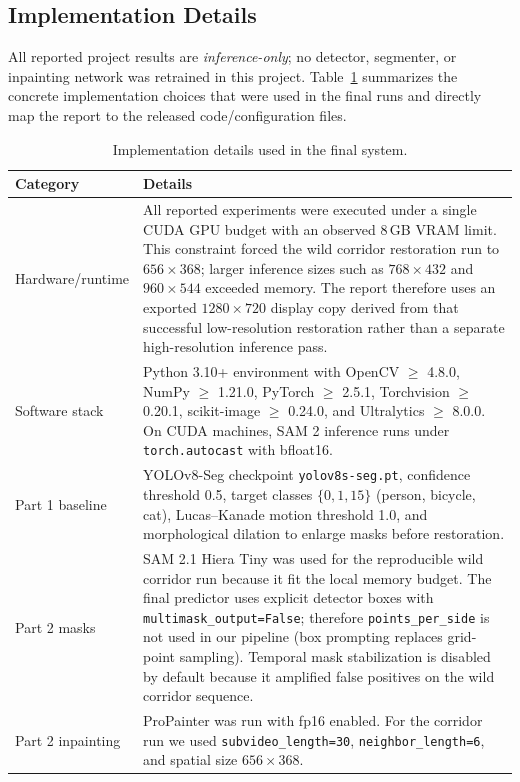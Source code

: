 \documentclass[10pt,twocolumn,letterpaper]{article}
\begin{document}
\subsection{Implementation Details}
All reported project results are \emph{inference-only}; no detector, segmenter, or inpainting network was retrained in this project. Table~\ref{tab:impl} summarizes the concrete implementation choices that were used in the final runs and directly map the report to the released code/configuration files.

\begin{table}[t]
\centering
\small
\caption{Implementation details used in the final system.}
\label{tab:impl}
\begin{tabular}{lp{}}
\toprule
Category & Details \\
\midrule
Hardware/runtime & All reported experiments were executed under a single CUDA GPU budget with an observed 8\,GB VRAM limit. This constraint forced the wild corridor restoration run to $656\times368$; larger inference sizes such as $768\times432$ and $960\times544$ exceeded memory. The report therefore uses an exported $1280\times720$ display copy derived from that successful low-resolution restoration rather than a separate high-resolution inference pass. \\
Software stack & Python 3.10+ environment with OpenCV $\geq$ 4.8.0, NumPy $\geq$ 1.21.0, PyTorch $\geq$ 2.5.1, Torchvision $\geq$ 0.20.1, scikit-image $\geq$ 0.24.0, and Ultralytics $\geq$ 8.0.0. On CUDA machines, SAM 2 inference runs under \texttt{torch.autocast} with bfloat16. \\
Part 1 baseline & YOLOv8-Seg checkpoint \texttt{yolov8s-seg.pt}, confidence threshold 0.5, target classes $\{0,1,15\}$ (person, bicycle, cat), Lucas--Kanade motion threshold 1.0, and morphological dilation to enlarge masks before restoration. \\
Part 2 masks & SAM 2.1 Hiera Tiny was used for the reproducible wild corridor run because it fit the local memory budget. The final predictor uses explicit detector boxes with \texttt{multimask\_output=False}; therefore \texttt{points\_per\_side} is not used in our pipeline (box prompting replaces grid-point sampling). Temporal mask stabilization is disabled by default because it amplified false positives on the wild corridor sequence. \\
Part 2 inpainting & ProPainter was run with fp16 enabled. For the corridor run we used \texttt{subvideo\_length=30}, \texttt{neighbor\_length=6}, and spatial size $656\times368$. \\

\end{tabular}
\end{table}
\end{document}

